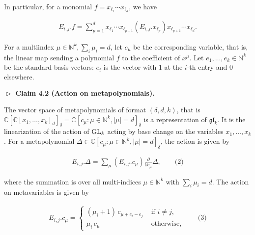 In particular, for a monomial $f=x_{\ell_{1}}\cdots x_{\ell_{d}}$, we have



\[\begin{aligned}
E_{i,j}.f=\textstyle\sum_{p=1}^{d}x_{\ell_{1}}\cdots x_{\ell_{p-1}}(E_{i,j}.x_{\ell_{p}})x_{\ell_{p+1}}\cdots x_{\ell_{d}}.
\end{aligned}\]





For a multiindex $\mu\in\mathbb{N}^{k},\sum_{i}\mu_{i}=d$, let $c_{\mu}$ be the corresponding variable, that is, the linear map sending a polynomial $f$ to the coefficient of $x^{\mu}$. Let $e_{1},\ldots,e_{k}\in\mathbb{N}^{k}$ be the standard basis vectors: $e_{i}$ is the vector with $1$ at the $i$-th entry and $0$ elsewhere.





\par\medskip\noindent\textbf{$\vartriangleright$ Claim 4.2 (Action on metapolynomials).}\par



The vector space of metapolynomials of format $(\delta,d,k)$, that is $\mathbb{C}[\mathbb{C}[x_{1},\ldots,x_{k}]_{d}]_{\delta}=\mathbb{C}[c_{\mu}:\mu\in\mathbb{N}^{k},|\mu|=d]_{\delta}$ is a representation of $\mathfrak{gl}_{k}$. It is the linearization of the action of $\textnormal{GL}_{k}$ acting by base change on the variables $x_{1},\ldots,x_{k}$.
For a metapolynomial $\Delta\in\mathbb{C}[c_{\mu}:\mu\in\mathbb{N}^{k},|\mu|=d]_{\delta}$, the action is given by





\[\begin{aligned}
\displaystyle E_{i,j}.\Delta=\sum_{\mu}(E_{i,j}.c_{\mu})\frac{\partial}{\partial c_{\mu}}\Delta,\qquad\text{(2)}
\end{aligned}\]


where the summation is over all multi-indices $\mu\in\mathbb{N}^{k}$ with $\sum_{i}\mu_{i}=d$. The action on metavariables is given by



\[\begin{aligned}
E_{i,j}.c_{\mu}=\begin{cases}(\mu_{i}+1)\,c_{\mu+e_{i}-e_{j}}&\text{ if }i\neq j,\\ \mu_{i}\,c_{\mu}&\text{ otherwise},\end{cases}\qquad\text{(3)}
\end{aligned}\]


